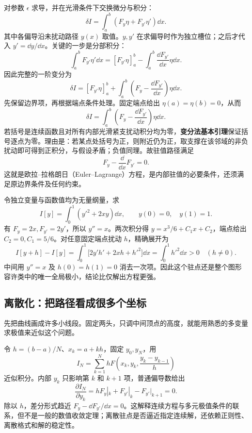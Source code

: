 对参数 $\epsilon$ 求导，并在光滑条件下交换微分与积分：
\[
\delta I=\int_a^b\left(F_y\eta+F_{y'}\eta'\right)\dd x.
\]
其中各偏导沿未扰动路径 $y(x)$ 取值。$y,y'$ 在求偏导时作为独立槽位；之后才代入 $y'=\dd y/\dd x$。关键的一步是分部积分：
\[
\int_a^b F_{y'}\eta'\dd x
=[F_{y'}\eta]_a^b-\int_a^b\frac{\dd F_{y'}}{\dd x}\eta\dd x.
\]
因此完整的一阶变分为
\begin{equation}\label{eq:variation-boundary}
\delta I=[F_{y'}\eta]_a^b+
\int_a^b\left(F_y-\frac{\dd F_{y'}}{\dd x}\right)\eta\dd x.
\end{equation}
先保留边界项，再根据端点条件处理。固定端点给出 $\eta(a)=\eta(b)=0$，从而
\begin{equation}\label{eq:first-variation}
\delta I=\int_a^b\left(F_y-\frac{\dd F_{y'}}{\dd x}\right)\eta\dd x.
\end{equation}
若括号是连续函数且对所有内部光滑紧支扰动积分均为零，\textbf{变分法基本引理}保证括号逐点为零。理由是：若某点处括号为正，则附近仍为正，取支撑在该邻域的非负扰动即可得到正积分，与假设矛盾；负值同理。故驻值路径满足
\begin{equation}\label{eq:euler-lagrange}
\boxed{F_y-\frac{\dd}{\dd x}F_{y'}=0.}
\end{equation}
这就是欧拉--拉格朗日（Euler--Lagrange）方程，是内部驻值的必要条件，还须满足原边界条件及任何约束。

\begin{example}[一个可直接检验的驻值函数]
令独立变量与函数值均为无量纲量，求
\[
I[y]=\int_0^1(y'^2+2xy)\dd x,\qquad y(0)=0,\quad y(1)=1.
\]
有 $F_y=2x,F_{y'}=2y'$，所以 $y''=x$。两次积分得 $y=x^3/6+C_1x+C_2$，端点给出 $C_2=0,C_1=5/6$。对任意固定端点扰动 $h$，精确展开为
\[
I[y+h]-I[y]=\int_0^1\bigl[2y'h'+2xh+h'^2\bigr]\dd x
=\int_0^1h'^2\dd x>0\quad(h\ne0).
\]
中间用 $y''=x$ 及 $h(0)=h(1)=0$ 消去一次项。因此这个驻点还是整个图形容许类中的唯一全局极小，结论比仅解出方程更强。
\end{example}

\subsection{离散化：把路径看成很多个坐标}
先把曲线画成许多小线段。固定两头，只调中间顶点的高度，就能用熟悉的多变量求极值来近似这个问题。

令 $h=(b-a)/N$、$x_k=a+kh$，固定 $y_0,y_N$，用
\begin{equation}\label{eq:discrete-functional}
I_N=\sum_{k=1}^NhF\left(x_k,y_k,\frac{y_k-y_{k-1}}h\right)
\end{equation}
近似积分。内部 $y_k$ 只影响第 $k$ 和 $k+1$ 项，普通偏导数给出
\begin{equation}\label{eq:discrete-el}
\frac{\partial I_N}{\partial y_k}
=hF_y|_k+F_{y'}|_k-F_{y'}|_{k+1}=0.
\end{equation}
除以 $h$，差分形式趋近 $F_y-\dd F_{y'}/\dd x=0$。这解释连续方程与多元极值条件的联系，但不是一般的数值收敛定理；离散驻点是否逼近指定连续解，还依赖正则性、离散格式和解的稳定性。

